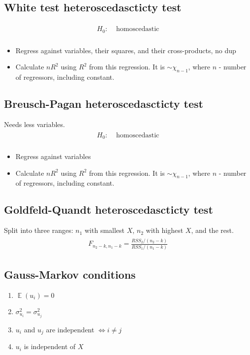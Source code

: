 \documentclass{article}
\def\Exp#1{{\operatorname{\mathbb{E}} \left({#1}\right)}}
\def\Eq#1{{\begin{gather}\begin{split} #1 \end{split}\end{gather}}}
\begin{document}
\begin{multicols}{2}
\subsection*{White test heteroscedascticty test}
\Eq{
    H_0: &\text{ homoscedastic} \\
}
\begin{itemize}
\item Regress against variables, their squares, and their cross-products, no dup
\item Calculate $n R^2$ using $R^2$ from this regression. It is $\sim \chi_{n-1}$, where $n$ - number of regressors, including constant.
\end{itemize}

\subsection*{Breusch-Pagan heteroscedascticty test}
Needs less variables.
\Eq{
    H_0: &\text{ homoscedastic} \\
}
\begin{itemize}
\item Regress against variables
\item Calculate $n R^2$ using $R^2$ from this regression. It is $\sim \chi_{n-1}$, where $n$ - number of regressors, including constant.
\end{itemize}

\subsection*{Goldfeld-Quandt heteroscedascticty test}
Split into three ranges: $n_1$ with smallest $X$, $n_2$ with highest $X$, and the rest.
\Eq{
F_{n_2-k,n_1-k} = \frac{RSS_2/(n_2 - k)}{RSS_1/(n_1 - k)}
}
\subsection*{Gauss-Markov conditions}
\begin{enumerate}
\item $\Exp{u_i} = 0$
\item $\sigma_{u_i}^2 = \sigma_{u_j}^2$
\item $u_i$ and $u_j$ are independent $\iff i \neq j$
\item $u_i$ is independent of $X$
\end{enumerate}

\end{multicols}
\end{document}
